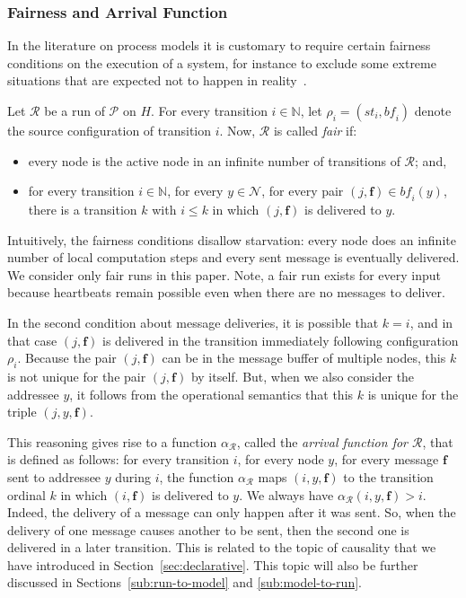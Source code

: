 \documentclass{tlp}
\newcommand{\Nat}{\mathbb{N}}  \newcommand{\len}[1]{|#1|} \newcommand{\rom}[1]{\text{\emph{(#1)}}} \newcommand{\romI}{\rom i}
\newcommand{\ded}{\mathcal{P}}
\newcommand{\fc}{\boldsymbol{f}}
\newcommand{\nw}{\mathcal{N}}
\newcommand{\cnf}{\rho}
\newcommand{\cnfs}{\mathit{st}}
\newcommand{\cnfb}{\mathit{bf}}
\newcommand{\pair}[2]{(#1,#2)}
\newcommand{\run}{\mathcal{R}}
\newcommand{\arr}{\alpha_{\run}}
\begin{document}
\subsubsection{Fairness and Arrival Function}

\label{sub:paper-fairness-and-arrival}

In the literature on process models it is customary to require certain
fairness conditions on the execution of a system, for instance to
exclude some extreme situations that are expected not to happen in
reality~\cite{francez_fairness,apt_fairness,lamport_fairness}. 

Let $\run$ be a run of $\ded$ on $H$. For every transition $i\in\Nat$,
let $\cnf_{i}=(\cnfs_{i},\cnfb_{i})$ denote the source configuration
of transition $i$. Now, $\run$ is called \emph{fair} if:
\begin{itemize}
\item every node is the active node in an infinite number of transitions
of $\run$; and,
\item for every transition $i\in\Nat$, for every $y\in\nw$, for every
pair $\pair j{\fc}\in\cnfb_{i}(y)$, there is a transition $k$ with
$i\leq k$ in which $\pair j{\fc}$ is delivered to $y$.
\end{itemize}
Intuitively, the fairness conditions disallow starvation: every node
does an infinite number of local computation steps and every sent
message is eventually delivered. We consider only fair runs in this
paper. Note, a fair run exists for every input because heartbeats
remain possible even when there are no messages to deliver.

In the second condition about message deliveries, it is possible that
$k=i$, and in that case $\pair j{\fc}$ is delivered in the transition
immediately following configuration $\cnf_{i}$. Because the pair
$\pair j{\fc}$ can be in the message buffer of multiple nodes, this
$k$ is not unique for the pair $\pair j{\fc}$ by itself. But, when
we also consider the addressee $y$, it follows from the operational
semantics that this $k$ is unique for the triple $(j,y,\fc)$. 

This reasoning gives rise to a function $\arr$, called the \emph{arrival
function for $\run$}, that is defined as follows: for every transition
$i$, for every node $y$, for every message $\fc$ sent to addressee
$y$ during $i$, the function $\arr$ maps $(i,y,\fc)$ to the transition
ordinal $k$ in which $\pair i{\fc}$ is delivered to $y$. We always
have $\arr(i,y,\fc)>i$. Indeed, the delivery of a message can only
happen after it was sent. So, when the delivery of one message causes
another to be sent, then the second one is delivered in a later transition.
This is related to the topic of causality that we have introduced
in Section~\ref{sec:declarative}. This topic will also be further
discussed in Sections~\ref{sub:run-to-model} and \ref{sub:model-to-run}.
\end{document}
